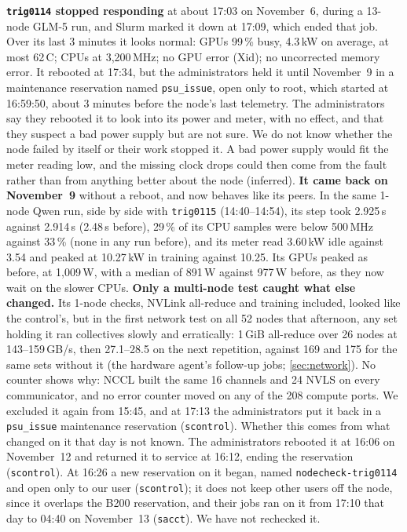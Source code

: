 \textbf{\texttt{trig0114} stopped responding} at about 17:03 on November~6, during a 13-node GLM-5 run, and Slurm marked it down at 17:09, which ended that job. Over its last 3 minutes it looks normal: GPUs 99\,\% busy, 4.3\,kW on average, at most 62\,\textdegree{}C; CPUs at 3,200\,MHz; no GPU error (Xid); no uncorrected memory error. It rebooted at 17:34, but the administrators held it until November~9 in a maintenance reservation named \texttt{psu\_issue}, open only to root, which started at 16:59:50, about 3 minutes before the node's last telemetry. The administrators say they rebooted it to look into its power and meter, with no effect, and that they suspect a bad power supply but are not sure. We do not know whether the node failed by itself or their work stopped it. A bad power supply would fit the meter reading low, and the missing clock drops could then come from the fault rather than from anything better about the node (inferred). \textbf{It came back on November~9} without a reboot, and now behaves like its peers. In the same 1-node Qwen run, side by side with \texttt{trig0115} (14:40--14:54), its step took 2.925\,s against 2.914\,s (2.48\,s before), 29\,\% of its CPU samples were below 500\,MHz against 33\,\% (none in any run before), and its meter read 3.60\,kW idle against 3.54 and peaked at 10.27\,kW in training against 10.25. Its GPUs peaked as before, at 1,009\,W, with a median of 891\,W against 977\,W before, as they now wait on the slower CPUs. \textbf{Only a multi-node test caught what else changed.} Its 1-node checks, NVLink all-reduce and training included, looked like the control's, but in the first network test on all 52 nodes that afternoon, any set holding it ran collectives slowly and erratically: 1\,GiB all-reduce over 26 nodes at 143--159\,GB/s, then 27.1--28.5 on the next repetition, against 169 and 175 for the same sets without it (the hardware agent's follow-up jobs; \cref{sec:network}). No counter shows why: NCCL built the same 16 channels and 24 NVLS on every communicator, and no error counter moved on any of the 208 compute ports. We excluded it again from 15:45, and at 17:13 the administrators put it back in a \texttt{psu\_issue} maintenance reservation (\texttt{scontrol}). Whether this comes from what changed on it that day is not known. The administrators rebooted it at 16:06 on November~12 and returned it to service at 16:12, ending the reservation (\texttt{scontrol}). At 16:26 a new reservation on it began, named \texttt{nodecheck-trig0114} and open only to our user (\texttt{scontrol}); it does not keep other users off the node, since it overlaps the B200 reservation, and their jobs ran on it from 17:10 that day to 04:40 on November~13 (\texttt{sacct}). We have not rechecked it.

